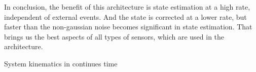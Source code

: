 In conclusion, the benefit of this architecture is state estimation at a high rate, independent of external events. And the state is corrected at a lower rate, but faster than the non-gaussian noise becomes significant in state estimation. That brings us the best aspects of all types of sensors, which are used in the architecture.


\sec System kinematics in continues time


